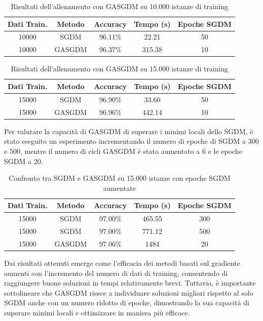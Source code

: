 \begin{table}[htbp]
\centering
\begin{tabular}{|c|c|c|c|c|}
\hline
\textbf{Dati Train.} & \textbf{Metodo} & \textbf{Accuracy} & \textbf{Tempo (s)} & \textbf{Epoche SGDM} \\
\hline
10000 & SGDM & 96.11\% & 22.21 & 50 \\
\hline
10000 & GASGDM & 96.37\% & 315.38 & 10 \\
\hline
\end{tabular}
\caption{Risultati dell'allenamento con GASGDM su 10.000 istanze di training}
\label{tab:GASGDM_results_10000}
\end{table}


\begin{table}[H]
    \centering
    \begin{tabular}{|c|c|c|c|c|}
    \hline
    \textbf{Dati Train.} & \textbf{Metodo} & \textbf{Accuracy} & \textbf{Tempo (s)} & \textbf{Epoche SGDM} \\
    \hline
    15000 & SGDM & 96.90\% & 33.60 & 50 \\
    \hline
    15000 & GASGDM & 96.96\% & 442.14 & 10 \\
    \hline
    \end{tabular}
    \caption{Risultati dell'allenamento con GASGDM su 15.000 istanze di training}
    \label{tab:GASGDM_results_15000}
    \end{table}
    Per valutare la capacità di GASGDM di superare i minimi locali dello SGDM, è stato eseguito un esperimento incrementando il numero di epoche di SGDM a 300 e 500, mentre il numero di cicli GASGDM è stato aumentato a 6 e le epoche SGDM a 20.
\begin{table}[H]
    \centering
    \begin{tabular}{|c|c|c|c|c|}
    \hline
    \textbf{Dati Train.} & \textbf{Metodo} & \textbf{Accuracy} & \textbf{Tempo (s)} & \textbf{Epoche SGDM} \\
    \hline
    15000 & SGDM & 97.00\% & 465.55 & 300 \\
    \hline
    15000 & SGDM & 97.00\% & 771.12 & 500 \\
    \hline
    15000 & GASGDM & 97.06\% & 1484 & 20 \\
    \hline
    \end{tabular}
    \caption{Confronto tra SGDM e GASGDM su 15.000 istanze con epoche SGDM aumentate}
    \label{tab:GASGDM_results2_15000}
    \end{table}
    Dai risultati ottenuti emerge come l'efficacia dei metodi basati sul gradiente aumenti con l'incremento del numero di dati di training, consentendo di raggiungere buone soluzioni in tempi relativamente brevi. 
    Tuttavia, è importante sottolineare che GASGDM riesce a individuare soluzioni migliori rispetto al solo SGDM anche con un numero ridotto di epoche, dimostrando la sua capacità di superare minimi locali e ottimizzare in maniera più efficace.


